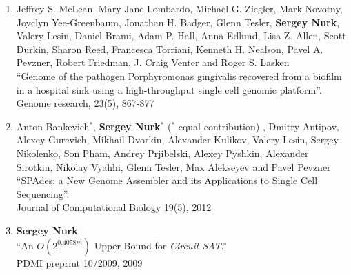 \begin{enumerate}
\item Jeffrey S. McLean, Mary-Jane Lombardo, Michael G. Ziegler, Mark Novotny, Joyclyn Yee-Greenbaum, Jonathan H. Badger, Glenn Tesler, \textbf{Sergey Nurk}, Valery Lesin, Daniel Brami, Adam P. Hall, Anna Edlund, Lisa Z. Allen, Scott Durkin, Sharon Reed, Francesca Torriani, Kenneth H. Nealson, Pavel A. Pevzner, Robert Friedman, J. Craig Venter and Roger S. Lasken \\
``Genome of the pathogen Porphyromonas gingivalis recovered from a biofilm in a hospital sink using a high-throughput single cell genomic platform''. \\
Genome research, 23(5), 867-877

\item Anton Bankevich$^*$, \textbf{Sergey Nurk}$^*$ ($^*$ equal contribution)%
, Dmitry Antipov, Alexey Gurevich, Mikhail Dvorkin, Alexander Kulikov, Valery Lesin, Sergey Nikolenko, Son Pham, Andrey Prjibelski, Alexey Pyshkin, Alexander Sirotkin, Nikolay Vyahhi, Glenn Tesler, Max Alekseyev and Pavel Pevzner \\
``SPAdes: a New Genome Assembler and its Applications to Single Cell Sequencing''.\\
Journal of Computational Biology 19(5), 2012

\item \textbf{Sergey Nurk} \\
``An $O(2^{0.4058m})$ Upper Bound for \textit{Circuit SAT}.''\\
PDMI preprint 10/2009, 2009
\end{enumerate}

